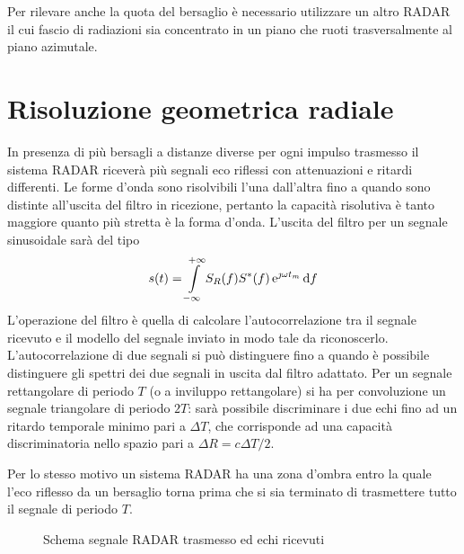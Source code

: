 Per rilevare anche la quota del bersaglio è necessario utilizzare un altro \ac{RADAR} il cui fascio di radiazioni sia concentrato in un piano che ruoti trasversalmente al piano azimutale.

\section{Risoluzione geometrica radiale}
In presenza di più bersagli a distanze diverse per ogni impulso trasmesso il sistema \ac{RADAR} riceverà più segnali eco riflessi con attenuazioni e ritardi differenti. Le forme d'onda sono risolvibili l'una dall'altra fino a quando sono distinte all'uscita del filtro in ricezione, pertanto la capacità risolutiva è tanto maggiore quanto più stretta è la forma d'onda. L'uscita del filtro per un segnale sinusoidale sarà del tipo
\begin{equation}
s(t)=\int\limits_{-\infty}^{+\infty}{S_R(f){S}^\ast(f)\operatorname{e}^{\jmath\omega t_m}}{\,\mathop{}\!\mathrm{d}{f}}
\end{equation}
L'operazione del filtro è quella di calcolare l'autocorrelazione tra il segnale ricevuto e il modello del segnale inviato in modo tale da riconoscerlo. L'autocorrelazione di due segnali si può distinguere fino a quando è possibile distinguere gli spettri dei due segnali in uscita dal filtro adattato. Per un segnale rettangolare di periodo $T$ (o a inviluppo rettangolare) si ha per convoluzione un segnale triangolare di periodo $2T$: sarà possibile discriminare i due echi fino ad un ritardo temporale minimo pari a $\Delta T$, che corrisponde ad una capacità discriminatoria nello spazio pari a $\Delta R=c \Delta T/2$.

Per lo stesso motivo un sistema \ac{RADAR} ha una zona d'ombra entro la quale l'eco riflesso da un bersaglio torna prima che si sia terminato di trasmettere tutto il segnale di periodo $T$.

\begin{figure}[ht]\centering
{}\quad{}
\caption{Schema segnale \ac{RADAR} trasmesso ed echi ricevuti}
\end{figure}

